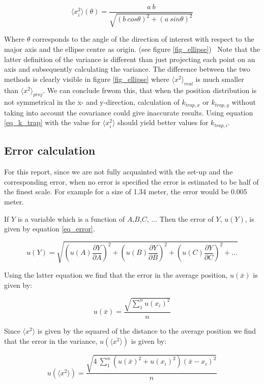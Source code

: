 \begin{equation}
	 \langle x_i^2 \rangle ( \theta ) = \frac{a \: b}{\sqrt{( b \: cos\theta)^2 + (a \: sin\theta )^2}}
\end{equation}

Where $\theta$ corresponds to the angle of the direction of interest with respect to the major axis and the ellipse centre as origin. (see figure \ref{fig_ellipse}) \
Note that the latter definition of the variance is different than just projecting each point on an axis and subsequently calculating the variance. The difference between the two methods is clearly visible in figure \ref{fig_ellipse} where $\langle x^2 \rangle _{real}$ is much smaller than $\langle x^2 \rangle _{proj}$. We can conclude frwom this, that when the position distribution is not symmetrical in the x- and y-direction, calculation of $k_{trap,x}$ or $k_{trap,y}$ without taking into account the covariance could give inaccurate results. Using equation \ref{eq_k_trap} with the value for $  \langle x_i^2 \rangle $ should yield better values for $k_{trap,i}$. 

\subsection{Error calculation}

For this report, since we are not fully acquainted with the set-up and the corresponding error, when no error is specified the error is estimated to be half of the finest scale. For example for a size of 1.34 meter, the error would be 0.005 meter.

If $Y$ is a variable which is a function of $A$,$B$,$C$, ... Then the error of $Y$, $u(Y)$, is given by equation \ref{eq_error}.

\begin{equation}
	\label{eq_error}
	u(Y) = \sqrt{\left(u(A) \frac{\partial Y}{\partial A}\right)^2 + \left(u(B) \frac{\partial Y}{\partial B}\right)^2 + \left(u(C) \frac{\partial Y}{\partial C}\right)^2 + ...}
\end{equation}

Using the latter equation we find that the error in the average position, $u(\bar{x})$ is given by:

\begin{equation}
	u(\bar{x}) =  \frac{ \sqrt{ \sum_1^n u(x_i)^2}}{n} 
\end{equation}

Since $ \langle x^2 \rangle $ is given by the squared of the distance to the average position we find that the error in the variance, $u( \langle x^2 \rangle ) $ is given by:

\begin{equation}
	u( \langle x^2 \rangle ) =  \frac{ \sqrt{ 4 \: \sum_1^n    \left( u(\bar{x})^2 + u(x_i)^2 \right) \left( \bar{x} - x_i \right)^2}}{n}
\end{equation}





